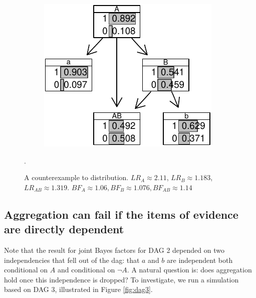 \documentclass[
  10pt,
  dvipsnames,enabledeprecatedfontcommands]{scrartcl}
\newcommand{\n}{\neg}
\begin{document}
\begin{figure}
{\begin{subfigure}[!ht]{0.45\textwidth}
\begin{center}\includegraphics[width=1\linewidth]{conjunction-appendix13_files/figure-latex/unnamed-chunk-24-1} \end{center}
\end{subfigure}} 
\caption{A counterexample to distribution. $LR_A  \approx 2.11$, $LR_B \approx 1.183$,  $LR_{AB} \approx 1.319$. $BF_A \approx  1.06, BF_B \approx  1.076, BF_{AB}\approx   1.14$}.
\label{tab:CPTconjunctionBNL}
\end{figure}

\hypertarget{aggregation-can-fail-if-the-items-of-evidence-are-directly-dependent}{%
\subsection*{Aggregation can fail if the items of evidence are directly
dependent}\label{aggregation-can-fail-if-the-items-of-evidence-are-directly-dependent}}

Note that the result for joint Bayes factors for \textsf{DAG 2} depended
on two independencies that fell out of the dag: that \(a\) and \(b\) are
independent both conditional on \(A\) and conditional on \(\n A\). A
natural question is: does aggregation hold once this independence is
dropped? To investigate, we run a simulation based on \textsf{DAG 3},
illustrated in Figure \ref{fig:dag3}.
\end{document}
